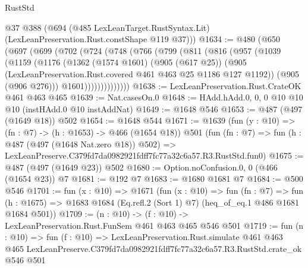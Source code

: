 \begin{lexlean}{RustStd}
\begin{coremodule}
      @37
      @388
      (@694 (@485 LexLeanTarget.RustSyntax.Lit) (LexLeanPreservation.Rust.constShape @119 @37)))
@1634 := @480
    (@650
      (@697
        (@699
          (@702
            (@724
              (@748
                (@766
                  (@799
                    (@811
                      (@816
                        (@957
                          (@1039
                            (@1159
                              (@1176
                                (@1362
                                  (@1574 @1601)
                                  (@905 (@617 @25))
                                  (@905
                                    (LexLeanPreservation.Rust.covered
                                      @461
                                      @463
                                      @25
                                      @1186
                                      @127
                                      @1192))
                                  (@905 (@906 @276)))
                                @1601))))))))))))))
@1638 := LexLeanPreservation.Rust.CrateOK @461 @463 @465
@1639 := Nat.casesOn.{0}
@1648 := HAdd.hAdd.{0, 0, 0} @10 @10 @10 (instHAdd.{0} @10 instAddNat)
@1649 := @1648 @546
@1653 := @487 (@497 (@1649 @18)) @502
@1654 := @1648 @544
@1671 := @1639
    (fun (y : @10) => (fn : @7) -> (h : @1653) -> @466 (@1654 @18))
    @501
    (fun (fn : @7) =>
    fun (h : @487 (@497 (@1648 Nat.zero @18)) @502) =>
    LexLeanPreserve.C379fd7da0982921fdff7fc77a32c6a57.R3.RustStd.fun0)
@1675 := @487 (@497 (@1649 @23)) @502
@1680 := Option.noConfusion.{0, 0} (@466 (@1654 @23)) @7
@1681 := @192 @7
@1683 := @1680 @1681 @7
@1684 := @500 @546
@1701 := fun (x : @10) =>
  @1671
    (fun (x : @10) =>
    fun (fn : @7) =>
    fun (h : @1675) => @1683 @1684 (Eq.refl.{2} (Sort 1) @7) (heq_of_eq.{1} @486 @1681 @1684 @501))
@1709 := (n : @10) -> (f : @10) -> LexLeanPreservation.Rust.FunSem @461 @463 @465 @546 @501
@1719 := fun (n : @10) =>
  fun (f : @10) =>
  LexLeanPreservation.Rust.simulate
    @461
    @463
    @465
    LexLeanPreserve.C379fd7da0982921fdff7fc77a32c6a57.R3.RustStd.crate_ok
    @546
    @501
\end{coremodule}
\end{lexlean}
